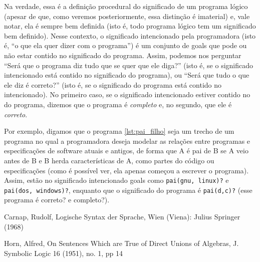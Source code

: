 \documentclass{article}
\theoremstyle{remark}
\begin{document}
  Na verdade, essa é a definição procedural do significado de um programa lógico (apesar de que, como veremos posteriormente, essa distinção é imaterial) e, vale notar, ela é sempre bem definida (isto é, todo programa lógico tem um significado bem definido). Nesse contexto, o significado intencionado pela programadora (isto é, ``o que ela quer dizer com o programa'') é um conjunto de goals que pode ou não estar contido no significado do programa. Assim, podemos nos perguntar ``Será que o
  programa diz tudo que se quer que ele diga?'' (isto é, se o significado intencionado está contido no significado do programa), ou ``Será que tudo o que ele diz é correto?'' (isto é, se o significado do programa está contido no intencionado). No primeiro caso, se o significado intencionado estiver contido no do programa, dizemos que o programa é \textit{completo} e, no segundo, que ele é \textit{correto}.

  Por exemplo, digamos que o programa \ref{lst:pai_filho}  seja um trecho de um programa no qual a programadora deseja modelar as relações entre programas e especificações de software atuais e antigos, de forma que A é pai de B se A veio antes de B e B herda características de A, como partes do código ou especificações (como é possível ver, ela apenas começou a escrever o programa). Assim, estão no significado intencionado goals como {\tt pai(gnu, linux)?} e {\tt pai(dos, windows)?}, enquanto que o
  significado do programa é {\tt pai(d,c)?} (esse programa é correto? e completo?).


  \begin{thebibliography}{1}

     Carnap, Rudolf,
     Logische Syntax der Sprache,
     Wien (Viena): Julius Springer (1968)

     Horn, Alfred,
     On Sentences Which are True of Direct Unions of Algebras,
     J. Symbolic Logic 16 (1951),
     no. 1,
     pp 14

  \end{thebibliography}
\end{document}
